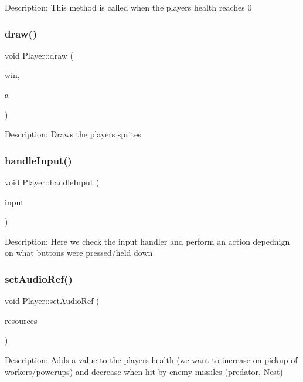 Description\+: This method is called when the players health reaches 0 \mbox{\label{class_player_a1c35f5008d1753ae66caec787a98171e}} 
\subsubsection{\texorpdfstring{draw()}{draw()}}
{\footnotesize\ttfamily void Player\+::draw (\begin{DoxyParamCaption}\item[{sf\+::\+Render\+Window \&}]{win,  }\item[{float}]{a }\end{DoxyParamCaption})}

Description\+: Draws the players sprites \mbox{\label{class_player_a9a2292e396c2b77758dde50adbed38d4}} 
\subsubsection{\texorpdfstring{handleInput()}{handleInput()}}
{\footnotesize\ttfamily void Player\+::handle\+Input (\begin{DoxyParamCaption}\item[{\mbox{\hyperlink{class_input_handler}{Input\+Handler}} \&}]{input }\end{DoxyParamCaption})}

Description\+: Here we check the input handler and perform an action depednign on what buttons were pressed/held down \mbox{\label{class_player_a8ec53df67585a2b4fdb57359bff28c93}} 
\subsubsection{\texorpdfstring{setAudioRef()}{setAudioRef()}}
{\footnotesize\ttfamily void Player\+::set\+Audio\+Ref (\begin{DoxyParamCaption}\item[{\mbox{\hyperlink{class_resource_manager}{Resource\+Manager}} \&}]{resources }\end{DoxyParamCaption})}

Description\+: Adds a value to the players health (we want to increase on pickup of workers/powerups) and decrease when hit by enemy missiles (predator, \mbox{\hyperlink{class_nest}{Nest}}) \mbox{\label{class_player_ad473d94189017b621f4471ed2d3fb73d}} 
